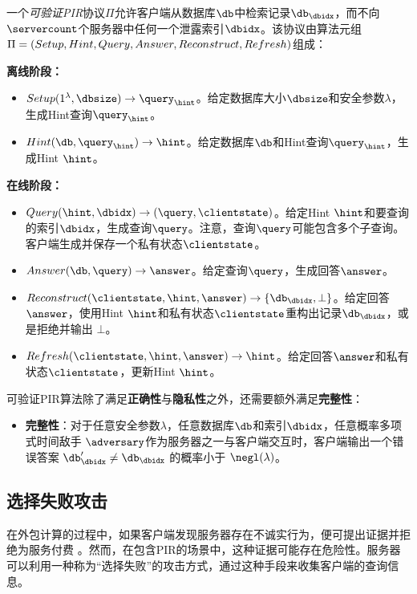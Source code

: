 \begin{definition}[可验证PIR]
    一个\textit{可验证PIR}协议$\Pi$允许客户端从数据库$\db$中检索记录$\db_\dbidx$，而不向$\servercount$个服务器中任何一个泄露索引$\dbidx$。该协议由算法元组$\Pi = (Setup, Hint, Query,\\ Answer, Reconstruct, Refresh)$组成：

    \noindent \textbf{离线阶段：}
    \begin{itemize}
        \item $Setup(1^\lambda,\dbsize) \rightarrow \query_\hint$。给定数据库大小$\dbsize$和安全参数$\lambda$，生成Hint查询$\query_\hint$。
        \item $Hint(\db, \query_\hint) \rightarrow \hint$。给定数据库$\db$和Hint查询$\query_\hint$，生成Hint $\hint$。
    \end{itemize}
    \noindent \textbf{在线阶段：}
    \begin{itemize}
        \item $Query(\hint, \dbidx) \rightarrow (\query, \clientstate)$。给定Hint $\hint$和要查询的索引$\dbidx$，生成查询$\query$。注意，查询$\query$可能包含多个子查询。客户端生成并保存一个私有状态$\clientstate$。
        \item $Answer(\db, \query) \rightarrow \answer$。给定查询$\query$，生成回答$\answer$。
        \item $Reconstruct(\clientstate, \hint, \answer) \rightarrow \{\db_\dbidx, \bot\}$。给定回答$\answer$，使用Hint $\hint$和私有状态$\clientstate$重构出记录$\db_\dbidx$，或是拒绝并输出 $\bot$。
        \item $Refresh(\clientstate, \hint, \answer) \rightarrow \hint$。给定回答$\answer$和私有状态$\clientstate$，更新Hint $\hint$。
    \end{itemize}
    可验证PIR算法除了满足\textbf{正确性}与\textbf{隐私性}之外，还需要额外满足\textbf{完整性}：
    \begin{itemize}
        \item \textbf{完整性}：对于任意安全参数$\lambda$，任意数据库$\db$和索引$\dbidx$，任意概率多项式时间敌手 $\adversary$作为服务器之一与客户端交互时，客户端输出一个错误答案 $\db_\dbidx' \neq \db_\dbidx$ 的概率小于 $\negl(\lambda)$。
    \end{itemize}
\end{definition}

\subsection{选择失败攻击}
在外包计算的过程中，如果客户端发现服务器存在不诚实行为，便可提出证据并拒绝为服务付费 \cite{chen2012efficient, carbunar2011payments}。然而，在包含PIR的场景中，这种证据可能存在危险性。服务器可以利用一种称为“选择失败”的攻击方式，通过这种手段来收集客户端的查询信息。

